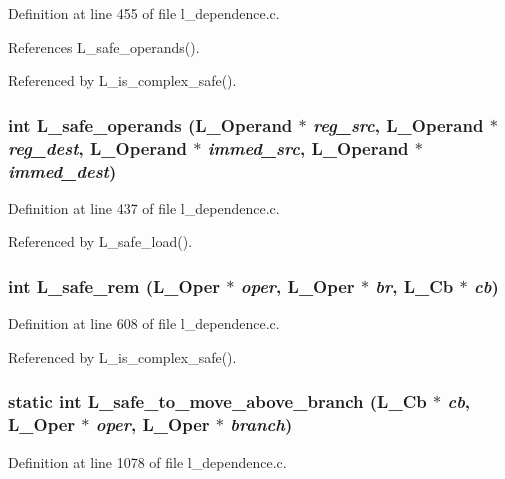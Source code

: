 Definition at line 455 of file l\_\-dependence.c.

References L\_\-safe\_\-operands().

Referenced by L\_\-is\_\-complex\_\-safe().
\subsubsection{\setlength{\rightskip}{0pt plus 5cm}int L\_\-safe\_\-operands (L\_\-Operand $\ast$ {\em reg\_\-src}, L\_\-Operand $\ast$ {\em reg\_\-dest}, L\_\-Operand $\ast$ {\em immed\_\-src}, L\_\-Operand $\ast$ {\em immed\_\-dest})}\label{l__dependence_8c_c1a24229bc1d954aebb8e9185946f3f1}




Definition at line 437 of file l\_\-dependence.c.

Referenced by L\_\-safe\_\-load().
\subsubsection{\setlength{\rightskip}{0pt plus 5cm}int L\_\-safe\_\-rem (L\_\-Oper $\ast$ {\em oper}, L\_\-Oper $\ast$ {\em br}, L\_\-Cb $\ast$ {\em cb})}\label{l__dependence_8c_09a5d5ce15b9f46918a83040d75832b0}




Definition at line 608 of file l\_\-dependence.c.

Referenced by L\_\-is\_\-complex\_\-safe().
\subsubsection{\setlength{\rightskip}{0pt plus 5cm}static int L\_\-safe\_\-to\_\-move\_\-above\_\-branch (L\_\-Cb $\ast$ {\em cb}, L\_\-Oper $\ast$ {\em oper}, L\_\-Oper $\ast$ {\em branch})\hspace{0.3cm}{\tt  [static]}}\label{l__dependence_8c_33aca5dc58648aa7d62b7a93178ce690}




Definition at line 1078 of file l\_\-dependence.c.


